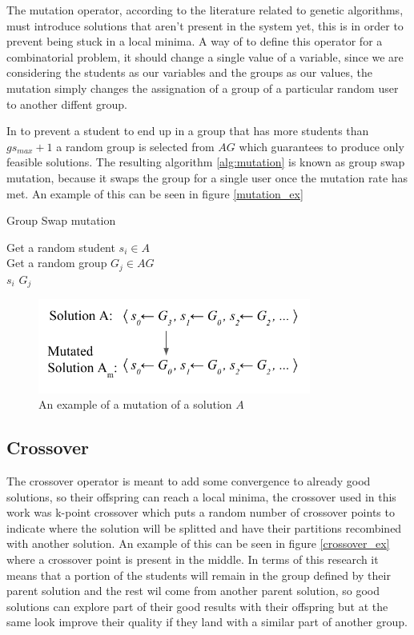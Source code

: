 The mutation operator, according to the literature related to genetic algorithms, must introduce solutions that aren't present in the system yet, this is in order to prevent being stuck in a local minima. A way of to define this operator for a combinatorial problem, it should change a single value of a variable, since we are considering the students as our variables and the groups as our values, the mutation simply changes the assignation of a group of a particular random user to another diffent group.

In to prevent a student to end up in a group that has more students than $gs_{max} + 1$ a random group is selected from $AG$ which guarantees to produce only feasible solutions. The resulting algorithm \ref{alg:mutation} is known as group swap mutation, because it swaps the group for a single user once the mutation rate has met. An example of this can be seen in figure \ref{mutation_ex}

\begin{algorithm}[H]
    \caption{Group Swap mutation}
    \label{alg:mutation}
    \SetAlgoLined 
    Get a random student $s_i \in A$\;\\
    Get a random group $G_j \in AG$\;\\
    $s_i$ \gets $G_j$ 
\end{algorithm}

\begin{figure}
    \centering
    \includegraphics[width=0.8\textwidth]{images/mutation_g.png}
    \caption{An example of a mutation of a solution $A$}
    \label{fig:mutation_ex}
\end{figure}

\subsection{Crossover}

The crossover operator is meant to add some convergence to already good solutions, so their offspring can reach a local minima, the crossover used in this work was k-point crossover \cite{nomura1997analysis} which puts a random number of crossover points to indicate where the solution will be splitted and have their partitions recombined with another solution. An example of this can be seen in figure \ref{crossover_ex} where a crossover point is present in the middle. In terms of this research it means that a portion of the students will remain in the group defined by their parent solution and the rest wil come from another parent solution, so good solutions can explore part of their good results with their offspring but at the same look improve their quality if they land with a similar part of another group.

